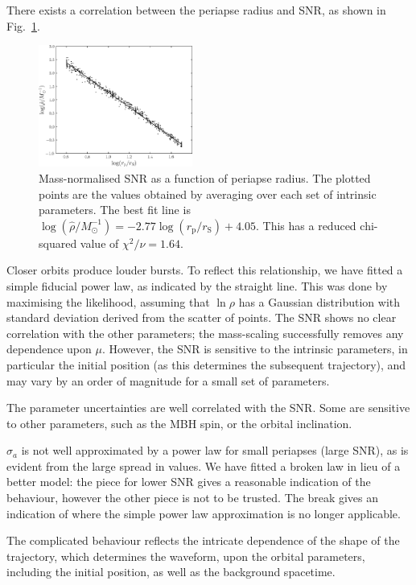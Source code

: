 \documentclass[useAMS,usedcolumn,usegraphicx,usenatbib]{mn2e}
\newcommand{\figref}[1]{Fig.~\ref{fig:#1}}
\newcommand{\sub}[1]{\ensuremath{_\mathrm{#1}}}
\begin{document}
There exists a correlation between the periapse radius and SNR, as shown in \figref{SNR}.
\begin{figure}
  \begin{center}
  \includegraphics[width=0.45\textwidth]{Fig_SNR}
    \caption{Mass-normalised SNR as a function of periapse radius. The plotted points are the values obtained by averaging over each set of intrinsic parameters. The best fit line is $\log(\hat{\rho}/M_\odot^{-1}) = -2.77\log(r\sub{p}/r\sub{S}) + 4.05$. This has a reduced chi-squared value of $\chi^2/\nu = 1.64$.}
    \label{fig:SNR}
  \end{center}
\end{figure}
Closer orbits produce louder bursts. To reflect this relationship, we have fitted a simple fiducial power law, as indicated by the straight line. This was done by maximising the likelihood, assuming that $\ln \rho$ has a Gaussian distribution with standard deviation derived from the scatter of points. The SNR shows no clear correlation with the other parameters; the mass-scaling successfully removes any dependence upon $\mu$. However, the SNR is sensitive to the intrinsic parameters, in particular the initial position (as this determines the subsequent trajectory), and may vary by an order of magnitude for a small set of parameters.

The parameter uncertainties are well correlated with the SNR. Some are sensitive to other parameters, such as the MBH spin, or the orbital inclination.

$\sigma_a$ is not well approximated by a power law for small periapses (large SNR), as is evident from the large spread in values. We have fitted a broken law in lieu of a better model: the piece for lower SNR gives a reasonable indication of the behaviour, however the other piece is not to be trusted. The break gives an indication of where the simple power law approximation is no longer applicable.

The complicated behaviour reflects the intricate dependence of the shape of the trajectory, which determines the waveform, upon the orbital parameters, including the initial position, as well as the background spacetime.
\end{document}
